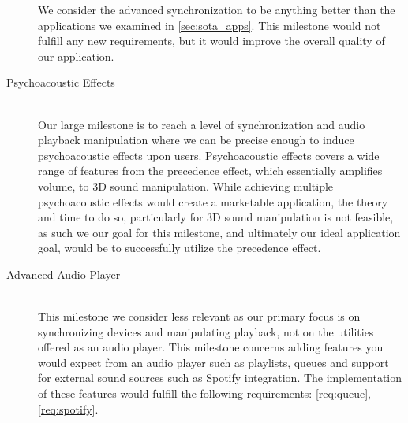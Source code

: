 \begin{description}
        We consider the advanced synchronization to be anything better than the applications we examined in \cref{sec:sota_apps}.
        This milestone would not fulfill any new requirements, but it would improve the overall quality of our application.
    \item [Psychoacoustic Effects] \hfill \\
        Our large milestone is to reach a level of synchronization and audio playback manipulation where we can be precise enough to induce psychoacoustic effects upon users.
        Psychoacoustic effects covers a wide range of features from the precedence effect, which essentially amplifies volume, to 3D sound manipulation.
        While achieving multiple psychoacoustic effects would create a marketable application, the theory and time to do so, particularly for 3D sound manipulation is not feasible, as such we our goal for this milestone, and ultimately our ideal application goal, would be to successfully utilize the precedence effect.
    \item [Advanced Audio Player] \hfill \\
        This milestone we consider less relevant as our primary focus is on synchronizing devices and manipulating playback, not on the utilities offered as an audio player.
        This milestone concerns adding features you would expect from an audio player such as playlists, queues and support for external sound sources such as Spotify integration.
        The implementation of these features would fulfill the following requirements: \ref{req:queue}, \ref{req:spotify}.
\end{description}

